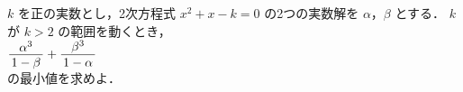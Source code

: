 ﻿\documentclass[../../../uem_tok_q.tex]{subfiles}
\begin{document}
    $k$ を正の実数とし，2次方程式 $x^2+x-k=0$ の2つの実数解を $\alpha$，$\beta$ とする．%
    $k$ が $k>2$ の範囲を動くとき，\\
    \hspace{3\zw}%
    $\displaystyle%
        \myfraca{\alpha^3}{1-\beta}+\myfraca{\beta^3}{1-\alpha}%
    $\\
    の最小値を求めよ．
\end{document}
